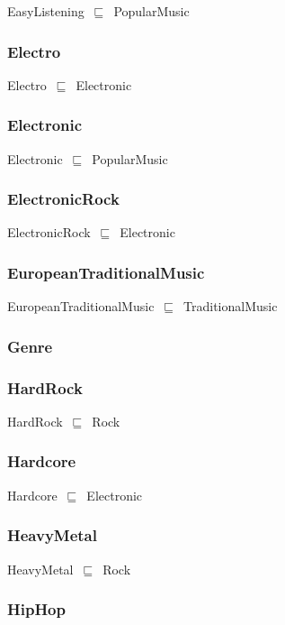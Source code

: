 \documentclass{article}
\begin{document}
EasyListening~\ensuremath{\sqsubseteq}~PopularMusic~

\subsubsection*{Electro}

Electro~\ensuremath{\sqsubseteq}~Electronic~

\subsubsection*{Electronic}

Electronic~\ensuremath{\sqsubseteq}~PopularMusic~

\subsubsection*{ElectronicRock}

ElectronicRock~\ensuremath{\sqsubseteq}~Electronic~

\subsubsection*{EuropeanTraditionalMusic}

EuropeanTraditionalMusic~\ensuremath{\sqsubseteq}~TraditionalMusic~

\subsubsection*{Genre}

\subsubsection*{HardRock}

HardRock~\ensuremath{\sqsubseteq}~Rock~

\subsubsection*{Hardcore}

Hardcore~\ensuremath{\sqsubseteq}~Electronic~

\subsubsection*{HeavyMetal}

HeavyMetal~\ensuremath{\sqsubseteq}~Rock~

\subsubsection*{HipHop}
\end{document}
